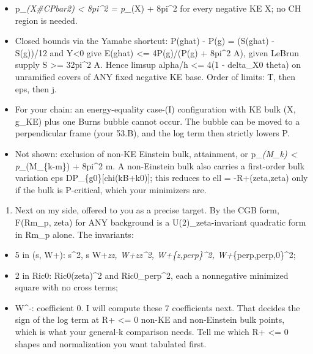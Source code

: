 \documentclass[
  10pt,
]{report}
\providecommand{\tightlist}{%
  \setlength{\itemsep}{0pt}\setlength{\parskip}{0pt}}
\begin{document}
\begin{itemize}
\tightlist
\item
  p\_\emph{(X\#CPbar2) \textless{} 8pi\^{}2 = p\_}(X) + 8pi\^{}2 for
  every negative KE X; no CH region is needed.
\item
  Closed bounds via the Yamabe shortcut: P(ghat) - P(g) = (S(ghat) -
  S(g))/12 and Y\textless0 give E(ghat) \textless= 4P(g)/(P(g) +
  8pi\^{}2 A), given LeBrun supply S \textgreater= 32pi\^{}2 A. Hence
  limsup alpha/h \textless= 4(1 - delta\_X0 theta) on unramified covers
  of ANY fixed negative KE base. Order of limits: T, then eps, then j.
\item
  For your chain: an energy-equality case-(I) configuration with KE bulk
  (X, g\_KE) plus one Burns bubble cannot occur. The bubble can be moved
  to a perpendicular frame (your 53.B), and the log term then strictly
  lowers P.
\item
  Not shown: exclusion of non-KE Einstein bulk, attainment, or
  p\_\emph{(M\_k) \textless{} p\_}(M\_\{k-m\}) + 8pi\^{}2 m. A
  non-Einstein bulk also carries a first-order bulk variation eps
  DP\_\{g0\}{[}chi(kB+k0){]}; this reduces to ell = -R+(zeta,zeta) only
  if the bulk is P-critical, which your minimizers are.
\end{itemize}

\begin{enumerate}
\def\labelenumi{(\arabic{enumi})}
\setcounter{enumi}{2}
\tightlist
\item
  Next on my side, offered to you as a precise target. By the CGB form,
  F(Rm\_p, zeta) for ANY background is a U(2)\_zeta-invariant quadratic
  form in Rm\_p alone. The invariants:
\end{enumerate}

\begin{itemize}
\tightlist
\item
  5 in (s, W+): s\^{}2, s W+\emph{zz, W+\emph{zz\^{}2,
  \textbar W+}\{z,perp\}\textbar\^{}2,
  \textbar W+}\{perp,perp,0\}\textbar\^{}2;
\item
  2 in Ric0: \textbar Ric0(zeta)\textbar\^{}2 and
  \textbar Ric0\_perp\textbar\^{}2, each a nonnegative minimized square
  with no cross terms;
\item
  W\^{}-: coefficient 0. I will compute these 7 coefficients next. That
  decides the sign of the log term at R+ \textless= 0 non-KE and
  non-Einstein bulk points, which is what your general-k comparison
  needs. Tell me which R+ \textless= 0 shapes and normalization you want
  tabulated first.
\end{itemize}
\end{document}
